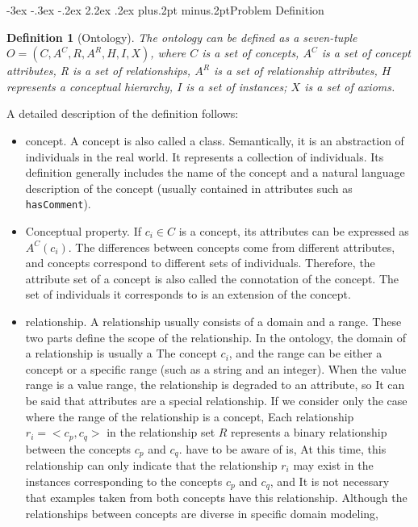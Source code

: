 \documentclass[twoside]{article}
\makeatletter
\def\section{\@startsection{section}{1}{\z@}%
 {-3ex \@plus -.3ex \@minus -.2ex}%
 {2.2ex \@plus.2ex}%
{\normalfont\normalsize\protect\baselineskip=14.5pt plus.2pt minus.2pt\bfseries}}
\makeatother
\begin{document}
\begin{multicols}{2}
\section{Problem Definition}

{\bf Definition 1} (Ontology). {\it The ontology can be defined as a seven-tuple $O=(C, A ^ C, R, A ^ R, H, I, X)$, where $ C $ is a set of concepts, $ A ^ C $ is a set of concept attributes, R is a set of relationships, $ A ^ R $ is a set of relationship attributes, $ H $ represents a conceptual hierarchy, $ I $ is a set of instances; $ X $ is a set of axioms.}

A detailed description of the definition follows:

\begin {itemize}
\item concept. A concept is also called a class. Semantically, it is an abstraction of individuals in the real world. It represents a collection of individuals.
Its definition generally includes the name of the concept and a natural language description of the concept (usually contained in attributes such as \texttt {hasComment}).
\item Conceptual property. If $ c_i \in C $ is a concept, its attributes can be expressed as $ A ^ C (c_i) $.
The differences between concepts come from different attributes, and concepts correspond to different sets of individuals. Therefore, the attribute set of a concept is also called the connotation of the concept.
The set of individuals it corresponds to is an extension of the concept.
\item relationship. A relationship usually consists of a domain and a range. These two parts define the scope of the relationship. In the ontology, the domain of a relationship is usually a
The concept $ c_i $, and the range can be either a concept or a specific range (such as a string and an integer). When the value range is a value range, the relationship is degraded to an attribute, so
It can be said that attributes are a special relationship. If we consider only the case where the range of the relationship is a concept,
Each relationship $ r_i = <c_p, c_q> $ in the relationship set $ R $ represents a binary relationship between the concepts $ c_p $ and $ c_q $. have to be aware of is,
At this time, this relationship can only indicate that the relationship $ r_i $ may exist in the instances corresponding to the concepts $ c_p $ and $ c_q $, and
It is not necessary that examples taken from both concepts have this relationship. Although the relationships between concepts are diverse in specific domain modeling,

\end{itemize}
\end{multicols}
\end{document}
